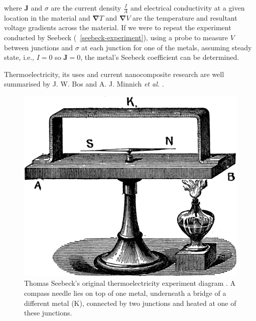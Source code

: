 \documentclass[12pt,draft]{article}
\newcommand{\figref}[2][\figurename~]{#1\ref{#2}}
\renewcommand{\vec}[1]{\mathbf{#1}}
\begin{document}
where $\vec{J}$ and $\sigma$ are the current density $\frac{I}{A}$ and electrical conductivity at a given location in the material and $\vec{\nabla} T$ and $\vec{\nabla} V$ are the temperature and resultant voltage gradients across the material. If we were to repeat the experiment conducted by Seebeck (\figref{seebeck-experiment}), using a probe to measure $V$ between junctions and $\sigma$ at each junction for one of the metals, assuming steady state, i.e., $I=0$ so $\vec{J} = 0$, the metal's Seebeck coefficient can be determined.

Thermoelectricity, its uses and current nanocomposite research are well summarised by J. W. Bos \cite{bos-review} and A. J. Minnich \emph{et al.} \cite{minnich-review}.

\begin{figure}
	\centering
	\includegraphics[width=\textwidth]{seebeck-experiment-black.png}
	\caption{Thomas Seebeck's original thermoelectricity experiment diagram \cite{seebeck-original}. A compass needle lies on top of one metal, underneath a bridge of a different metal (K), connected by two junctions and heated at one of these junctions.}
	\label{fig:seebeck-experiment}
\end{figure}
\end{document}
